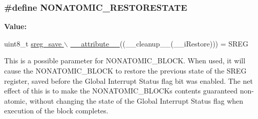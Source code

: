 \subsubsection[{\texorpdfstring{N\+O\+N\+A\+T\+O\+M\+I\+C\+\_\+\+R\+E\+S\+T\+O\+R\+E\+S\+T\+A\+TE}{NONATOMIC_RESTORESTATE}}]{\setlength{\rightskip}{0pt plus 5cm}\#define N\+O\+N\+A\+T\+O\+M\+I\+C\+\_\+\+R\+E\+S\+T\+O\+R\+E\+S\+T\+A\+TE}\hypertarget{group__util__atomic_gab075653bf638fae9db049575741d3152}{}\label{group__util__atomic_gab075653bf638fae9db049575741d3152}
{\bfseries Value\+:}
\begin{DoxyCode}
uint8\_t \hyperlink{stdint_8h_a772744ca0816d59e120b8f8a1ede64f0}{sreg\_save \(\backslash\)}
\hyperlink{stdint_8h_a772744ca0816d59e120b8f8a1ede64f0}{    \_\_attribute\_\_}((\_\_cleanup\_\_(\_\_iRestore))) = SREG
\end{DoxyCode}
This is a possible parameter for N\+O\+N\+A\+T\+O\+M\+I\+C\+\_\+\+B\+L\+O\+CK. When used, it will cause the N\+O\+N\+A\+T\+O\+M\+I\+C\+\_\+\+B\+L\+O\+CK to restore the previous state of the S\+R\+EG register, saved before the Global Interrupt Status flag bit was enabled. The net effect of this is to make the N\+O\+N\+A\+T\+O\+M\+I\+C\+\_\+\+B\+L\+O\+CK\textquotesingle{}s contents guaranteed non-\/atomic, without changing the state of the Global Interrupt Status flag when execution of the block completes. 